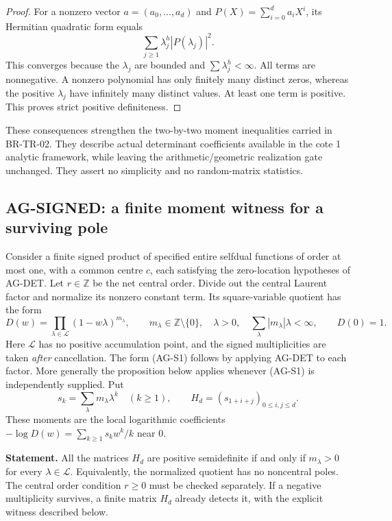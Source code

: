 \documentclass[11pt,a4paper]{article}
\begin{document}
\begin{proof}
For a nonzero vector $a=(a_0,\ldots,a_d)$ and
$P(X)=\sum_{i=0}^d a_iX^i$, its Hermitian quadratic form equals
\[
 \sum_{j\ge1}\lambda_j^h|P(\lambda_j)|^2.
\]
This converges because the $\lambda_j$ are bounded and
$\sum\lambda_j^h<\infty$. All terms are nonnegative. A nonzero
polynomial has only finitely many distinct zeros, whereas the positive
$\lambda_j$ have infinitely many distinct values. At least one term
is positive. This proves strict positive definiteness.
\end{proof}

These consequences strengthen the two-by-two moment inequalities carried
in BR-TR-02. They describe actual determinant coefficients available in
the cote 1 analytic framework, while leaving the arithmetic/geometric
realization gate unchanged. They assert no simplicity and no
random-matrix statistics.

\subsection{AG-SIGNED: a finite moment witness for a surviving pole}
\label{ag:signed}

Consider a finite signed product of specified entire selfdual functions
of order at most one, with a common centre $c$, each satisfying the
zero-location hypotheses of AG-DET. Let $r\in\mathbb Z$ be the net
central order. Divide out the central Laurent factor and normalize its
nonzero constant term. Its square-variable quotient has the form
\[
 D(w)=\prod_{\lambda\in\mathcal L}(1-w\lambda)^{m_\lambda},
 \qquad m_\lambda\in\mathbb Z\setminus\{0\},\quad
 \lambda>0,\quad \sum_\lambda |m_\lambda|\lambda<\infty,
 \qquad D(0)=1.                                      \tag{AG-S1}
\]
Here $\mathcal L$ has no positive accumulation point, and the signed
multiplicities are taken \emph{after} cancellation. The form (AG-S1)
follows by applying AG-DET to each factor. More generally the proposition
below applies whenever (AG-S1) is independently supplied. Put
\[
 s_k=\sum_\lambda m_\lambda\lambda^k\quad(k\ge1),\qquad
 H_d=(s_{1+i+j})_{0\le i,j\le d}.
\]
These moments are the local logarithmic coefficients
$-\log D(w)=\sum_{k\ge1}s_kw^k/k$ near $0$.

\textbf{Statement.} All the matrices $H_d$ are positive semidefinite
if and only if $m_\lambda>0$ for every $\lambda\in\mathcal L$.
Equivalently, the normalized quotient has no noncentral poles. The
central order condition $r\ge0$ must be checked separately. If a
negative multiplicity survives, a finite matrix $H_d$ already detects it,
with the explicit witness described below.
\end{document}
